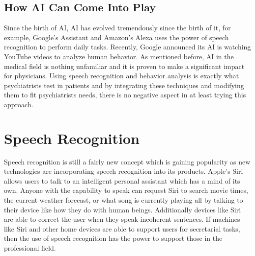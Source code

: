 \documentclass[11pt,technote,twocolumn]{IEEEtran}
\begin{document}
\subsection{How AI Can Come Into Play}
Since the birth of AI, AI has evolved tremendously since the birth of it, for example, Google's Assistant and Amazon's Alexa uses the power of speech recognition to perform daily tasks. Recently, Google announced its AI is watching YouTube videos to analyze human behavior. As mentioned before, AI in the medical field is nothing unfamiliar and it is proven to make a significant impact for physicians. Using speech recognition and behavior analysis is exactly what psychiatrists test in patients and by integrating these techniques and modifying them to fit psychiatrists needs, there is no negative aspect in at least trying this approach. 
\section{Speech Recognition}
Speech recognition is still a fairly new concept which is gaining popularity as new technologies are incorporating speech recognition into its products. Apple's Siri allows users to talk to an intelligent personal assistant which has a mind of its own. Anyone with the capability to speak can request Siri to search movie times, the current weather forecast, or what song is currently playing all by talking to their device like how they do with human beings. Additionally devices like Siri are able to correct the user when they speak incoherent sentences. If machines like Siri and other home devices are able to support users for secretarial tasks, then the use of speech recognition has the power to support those in the professional field.
\end{document}
